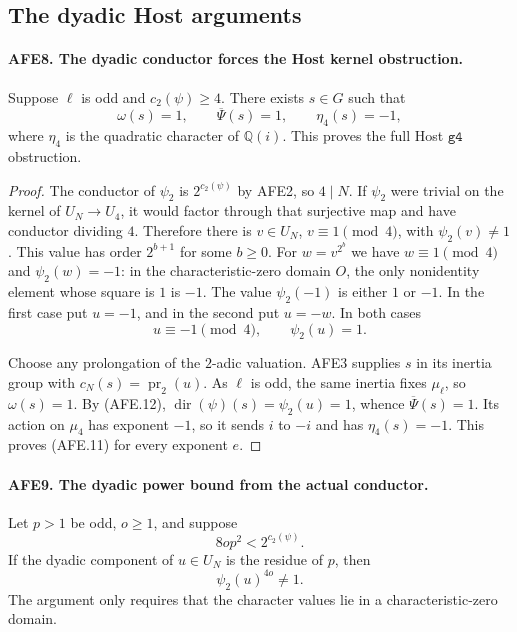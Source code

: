 \documentclass[11pt,a4paper]{article}
\numberwithin{equation}{section}
\theoremstyle{remark}\newtheorem{remark}[theorem]{Remark}
\begin{document}
\subsection{The dyadic Host arguments}

\paragraph{AFE8. The dyadic conductor forces the Host kernel obstruction.}
\label{claim:AFE8}
Suppose \(\ell\) is odd and \(c_2(\psi)\ge4\).
There exists \(s\in G\) such that
\[
       \omega(s)=1,\qquad \overline\Psi(s)=1,\qquad
                         \eta_4(s)=-1,                 \tag{AFE.11}
\]
where \(\eta_4\) is the quadratic character of
\(\mathbb Q(i)\).  This proves the full Host
\(\texttt{g4}\) obstruction.

\begin{proof}
The conductor of \(\psi_2\) is \(2^{c_2(\psi)}\)
by AFE2, so \(4\mid N\).
If \(\psi_2\) were trivial on the kernel of
\(U_N\to U_4\), it would factor through that
surjective map and have conductor dividing \(4\).
Therefore there is \(v\in U_N\), \(v\equiv1\pmod4\),
with \(\psi_2(v)\ne1\).
This value has order \(2^{b+1}\) for some \(b\ge0\).
For \(w=v^{2^b}\) we have \(w\equiv1\pmod4\)
and \(\psi_2(w)=-1\): in the characteristic-zero
domain \(O\), the only nonidentity element whose
square is \(1\) is \(-1\).
The value \(\psi_2(-1)\) is either \(1\) or \(-1\).
In the first case put \(u=-1\), and in the second
put \(u=-w\).  In both cases
\[
                    u\equiv-1\pmod4,\qquad
                    \psi_2(u)=1.                       \tag{AFE.12}
\]

Choose any prolongation of the \(2\)-adic valuation.
AFE3 supplies \(s\) in its inertia group with
\(c_N(s)=\operatorname{pr}_2(u)\).
As \(\ell\) is odd, the same inertia fixes
\(\mu_\ell\), so \(\omega(s)=1\).
By (AFE.12),
\(\operatorname{dir}(\psi)(s)=\psi_2(u)=1\),
whence \(\overline\Psi(s)=1\).
Its action on \(\mu_4\) has exponent \(-1\),
so it sends \(i\) to \(-i\) and has
\(\eta_4(s)=-1\).
This proves (AFE.11) for every exponent \(e\).
\end{proof}

\paragraph{AFE9. The dyadic power bound from the actual conductor.}
\label{claim:AFE9}
Let \(p>1\) be odd, \(o\ge1\), and suppose
\[
                  8op^2<2^{c_2(\psi)}.                 \tag{AFE.13}
\]
If the dyadic component of \(u\in U_N\) is the
residue of \(p\), then
\[
                         \psi_2(u)^{4o}\ne1.           \tag{AFE.14}
\]
The argument only requires that the character values
lie in a characteristic-zero domain.
\end{document}
